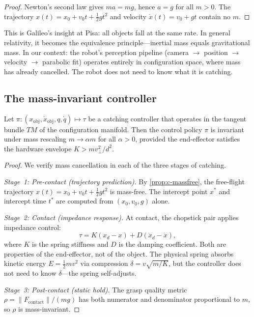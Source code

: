 \begin{proof}
Newton's second law gives $ma = mg$, hence $a = g$
for all $m > 0$.  The trajectory
$x(t) = x_0 + v_0 t + \frac{1}{2}g t^2$ and velocity
$\dot{x}(t) = v_0 + g t$ contain no $m$.
\end{proof}

\begin{remark}
This is Galileo's insight at Pisa: all objects fall at the
same rate.  In general relativity, it becomes the equivalence
principle---inertial mass equals gravitational mass.  In our
context: the robot's perception pipeline (camera $\to$
position $\to$ velocity $\to$ parabolic fit) operates
entirely in configuration space, where mass has already
cancelled.  The robot does not need to know what it is
catching.
\end{remark}

\subsection{The mass-invariant controller}

\begin{theorem}
\label{thm:c-equivalence}
Let $\pi\colon (x_{\mathrm{obj}}, \dot{x}_{\mathrm{obj}},
q, \dot{q}) \mapsto \tau$ be a catching controller that operates
in the tangent bundle $TM$ of the configuration manifold.
Then the control policy $\pi$ is invariant under mass rescaling
$m \to \alpha m$ for all $\alpha > 0$, provided the end-effector
satisfies the hardware envelope $K > mv_\perp^2/d^2$.
\end{theorem}

\begin{proof}
We verify mass cancellation in each of the three stages of
catching.

\emph{Stage~1: Pre-contact (trajectory prediction).}
By \cref{prop:c-massfree}, the free-flight trajectory
$x(t) = x_0 + v_0 t + \frac{1}{2}g t^2$ is mass-free.
The intercept point $x^*$ and intercept time $t^*$ are
computed from $(x_0, v_0, g)$ alone.

\emph{Stage~2: Contact (impedance response).}
At contact, the chopstick pair applies impedance control:
\[
  \tau = K(x_d - x) + D(\dot{x}_d - \dot{x}),
\]
where $K$ is the spring stiffness and $D$ is the damping
coefficient.  Both are properties of the end-effector, not
of the object.  The physical spring absorbs kinetic energy
$E = \frac{1}{2}mv^2$ via compression
$\delta = v\sqrt{m/K}$, but the controller does not need
to know $\delta$---the spring self-adjusts.

\emph{Stage~3: Post-contact (static hold).}
The grasp quality metric
$\rho = \|F_{\mathrm{contact}}\| / (mg)$ has both
numerator and denominator proportional to $m$, so $\rho$
is mass-invariant.
\end{proof}

